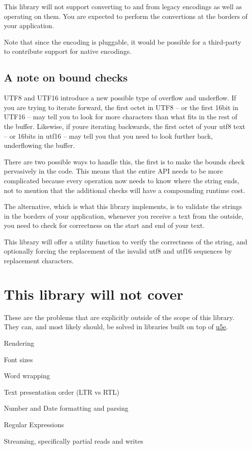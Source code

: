 This library will not support converting to and from legacy encodings as well as operating on them. You are expected to perform the convertions at the borders of your application.

Note that since the encoding is pluggable, it would be possible for a third-\/party to contribute support for native encodings.

\subsection*{A note on bound checks}

U\+T\+F8 and U\+T\+F16 introduce a new possible type of overflow and underflow. If you are trying to iterate forward, the first octet in U\+T\+F8 -- or the first 16bit in U\+T\+F16 -- may tell you to look for more characters than what fits in the rest of the buffer. Likewise, if you\textquotesingle{}re iterating backwards, the first octet of your utf8 text -- or 16bits in utf16 -- may tell you that you need to look further back, underflowing the buffer.

There are two possible ways to handle this, the first is to make the bounds check pervasively in the code. This means that the entire A\+PI needs to be more complicated because every operation now needs to know where the string ends, not to mention that the additional checks will have a compounding runtime cost.

The alternative, which is what this library implements, is to validate the strings in the borders of your application, whenever you receive a text from the outside, you need to check for correctness on the start and end of your text.

This library will offer a utility function to verify the correctness of the string, and optionally forcing the replacement of the invalid utf8 and utf16 sequences by replacement characters.

\section*{This library will not cover}

These are the problems that are explicitly outside of the scope of this library. They can, and most likely should, be solved in libraries built on top of \hyperlink{namespaceu5e}{u5e}.


\begin{DoxyItemize}
\item Rendering
\item Font sizes
\item Word wrapping
\item Text presentation order (L\+TR vs R\+TL)
\item Number and Date formatting and parsing
\item Regular Expressions
\item Streaming, specifically partial reads and writes
\end{DoxyItemize}

